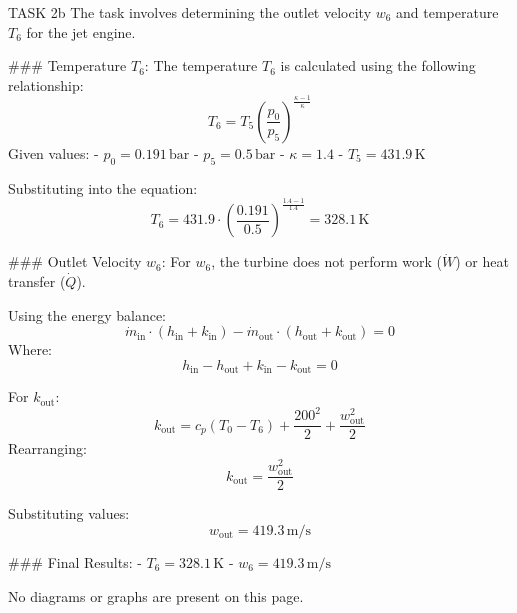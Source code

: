 TASK 2b  
The task involves determining the outlet velocity \( w_6 \) and temperature \( T_6 \) for the jet engine.  

### Temperature \( T_6 \):  
The temperature \( T_6 \) is calculated using the following relationship:  
\[
T_6 = T_5 \left( \frac{p_0}{p_5} \right)^{\frac{\kappa - 1}{\kappa}}
\]  
Given values:  
- \( p_0 = 0.191 \, \text{bar} \)  
- \( p_5 = 0.5 \, \text{bar} \)  
- \( \kappa = 1.4 \)  
- \( T_5 = 431.9 \, \text{K} \)  

Substituting into the equation:  
\[
T_6 = 431.9 \cdot \left( \frac{0.191}{0.5} \right)^{\frac{1.4 - 1}{1.4}} = 328.1 \, \text{K}
\]  

### Outlet Velocity \( w_6 \):  
For \( w_6 \), the turbine does not perform work (\( \dot{W} \)) or heat transfer (\( \dot{Q} \)).  

Using the energy balance:  
\[
\dot{m}_{\text{in}} \cdot (h_{\text{in}} + k_{\text{in}}) - \dot{m}_{\text{out}} \cdot (h_{\text{out}} + k_{\text{out}}) = 0
\]  
Where:  
\[
h_{\text{in}} - h_{\text{out}} + k_{\text{in}} - k_{\text{out}} = 0
\]  

For \( k_{\text{out}} \):  
\[
k_{\text{out}} = c_p (T_0 - T_6) + \frac{200^2}{2} + \frac{w_{\text{out}}^2}{2}
\]  
Rearranging:  
\[
k_{\text{out}} = \frac{w_{\text{out}}^2}{2}
\]  

Substituting values:  
\[
w_{\text{out}} = 419.3 \, \text{m/s}
\]  

### Final Results:  
- \( T_6 = 328.1 \, \text{K} \)  
- \( w_6 = 419.3 \, \text{m/s} \)  

No diagrams or graphs are present on this page.
